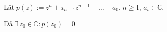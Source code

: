 \begin{theorem}
Låt $p(z) := z^n + a_{n-1}z^{n-1} + \dots + a_0$, $n \ge 1$, $a_i \in \mathbb{C}$.

Då $\exists\, z_0 \in \mathbb{C} : p(z_0) = 0$.
\end{theorem}
